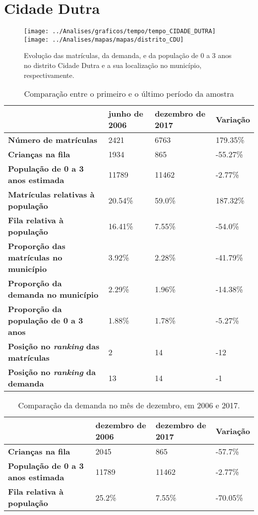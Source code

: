 \section{Cidade Dutra}
\begin{figure}[H]
	\centering
	\texttt{[image: ../Analises/graficos/tempo/tempo\_CIDADE\_DUTRA]}
	\texttt{[image: ../Analises/mapas/mapas/distrito\_CDU]}
	\caption{Evolução das matrículas, da demanda, e da população de 0 a 3 anos no distrito Cidade Dutra e a sua localização no município, respectivamente.}
\end{figure}
\begin{table}[H]
	\begin{tabular}{|l|l|l|l|}
		\hline
		\textbf{}                                      & \textbf{junho de 2006}       & \textbf{dezembro de 2017}    & \textbf{Variação} \\ \hline
		\textbf{Número de matrículas}                  & 2421 & 6763 & 179.35\% \\ \hline
		\textbf{Crianças na fila}                      & 1934 & 865 & -55.27\% \\ \hline
		\textbf{População de 0 a 3 anos estimada}      & 11789 & 11462 & -2.77\% \\ \hline
		\textbf{Matrículas relativas à população}      & 20.54\% & 59.0\% & 187.32\% \\ \hline
		\textbf{Fila relativa à população}             & 16.41\% & 7.55\% & -54.0\% \\ \hline
		\textbf{Proporção das matrículas no município} & 3.92\% & 2.28\% & -41.79\% \\ \hline
		\textbf{Proporção da demanda no município}     & 2.29\% & 1.96\% & -14.38\% \\ \hline
		\textbf{Proporção da população de 0 a 3 anos}  & 1.88\% & 1.78\% & -5.27\% \\ \hline
		\textbf{Posição no \textit{ranking} das matrículas}     & 2 & 14 & -12 \\ \hline
		\textbf{Posição no \textit{ranking} da demanda}         & 13 & 14 & -1 \\ \hline
	\end{tabular}
	\caption{Comparação entre o primeiro e o último período da amostra}
\end{table}
\begin{table}[H]
	\begin{tabular}{|l|l|l|l|}
		\hline
		\textbf{}                                 & \textbf{dezembro de 2006} & \textbf{dezembro de 2017} & \textbf{Variação} \\ \hline
		\textbf{Crianças na fila}                      & 2045 & 865 & -57.7\% \\ \hline
		\textbf{População de 0 a 3 anos estimada}      & 11789 & 11462 & -2.77\% \\ \hline
		\textbf{Fila relativa à população}             & 25.2\% & 7.55\% & -70.05\% \\ \hline
	\end{tabular}
	\caption{Comparação da demanda no mês de dezembro, em 2006 e 2017.}
\end{table}
